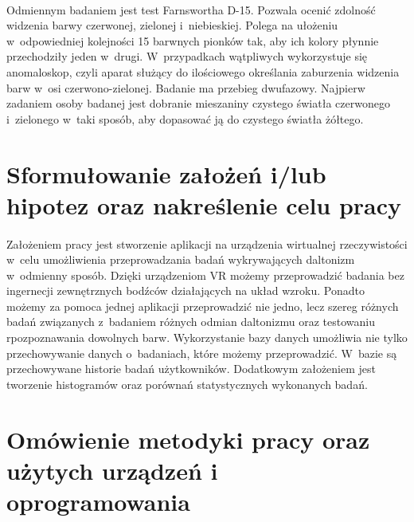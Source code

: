 \documentclass[12pt, letterpaper]{article}
\begin{document}
\paragraph{}
Odmiennym badaniem jest test Farnswortha D-15. Pozwala ocenić zdolność widzenia barwy czerwonej, zielonej i~niebieskiej. Polega na ułożeniu w~odpowiedniej kolejności 15 barwnych pionków tak, aby ich kolory płynnie przechodziły jeden w~drugi. W~przypadkach wątpliwych wykorzystuje się anomaloskop, czyli aparat służący do ilościowego określania zaburzenia widzenia barw w~osi czerwono-zielonej. Badanie ma przebieg dwufazowy. Najpierw zadaniem osoby badanej jest dobranie mieszaniny czystego światła czerwonego i~zielonego w~taki sposób, aby dopasować ją do czystego światła żółtego.

\section{Sformułowanie założeń i/lub hipotez oraz nakreślenie celu pracy}
\paragraph{}
Założeniem pracy jest stworzenie aplikacji na urządzenia wirtualnej rzeczywistości w~celu umożliwienia przeprowadzania badań wykrywających daltonizm w~odmienny sposób. Dzięki urządzeniom VR możemy przeprowadzić badania bez ingernecji zewnętrznych bodźców działających na układ wzroku. Ponadto możemy za pomoca jednej aplikacji przeprowadzić nie jedno, lecz szereg różnych badań związanych z~badaniem różnych odmian daltonizmu oraz testowaniu rpozpoznawania dowolnych barw. Wykorzystanie bazy danych umożliwia nie tylko przechowywanie danych o~badaniach, które możemy przeprowadzić. W~bazie są przechowywane historie badań użytkowników. Dodatkowym założeniem jest tworzenie histogramów oraz porównań statystycznych wykonanych badań. 

\section{Omówienie metodyki pracy oraz użytych urządzeń i oprogramowania}
\end{document}

